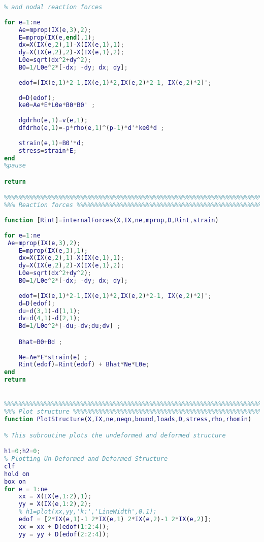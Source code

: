 \begin{lstlisting}[language=Matlab, caption = FE implementation for topology optimization, label=lst:CodeTopo]
% This subroutine recovers the element stress, element strain, 
% and nodal reaction forces
        
for e=1:ne
    Ae=mprop(IX(e,3),2);
    E=mprop(IX(e,end),1);
    dx=X(IX(e,2),1)-X(IX(e,1),1);
    dy=X(IX(e,2),2)-X(IX(e,1),2);
    L0e=sqrt(dx^2+dy^2);
    B0=1/L0e^2*[-dx; -dy; dx; dy];
    
    edof=[IX(e,1)*2-1,IX(e,1)*2,IX(e,2)*2-1, IX(e,2)*2]';
    
    d=D(edof);
    ke0=Ae*E*L0e*B0*B0' ;
    
    dgdrho(e,1)=v(e,1);
    dfdrho(e,1)=-p*rho(e,1)^(p-1)*d'*ke0*d ;
    
    strain(e,1)=B0'*d;
    stress=strain*E;
end
%pause

return

%%%%%%%%%%%%%%%%%%%%%%%%%%%%%%%%%%%%%%%%%%%%%%%%%%%%%%%%%%%%%%%%%%%%%%%%%%%
%%% Reaction forces %%%%%%%%%%%%%%%%%%%%%%%%%%%%%%%%%%%%%%%%%%%%%%%%%%%%%%%                                                        
                                                        
function [Rint]=internalForces(X,IX,ne,mprop,D,Rint,strain)                                                        
                                                        
for e=1:ne
 Ae=mprop(IX(e,3),2);
    E=mprop(IX(e,3),1);
    dx=X(IX(e,2),1)-X(IX(e,1),1);
    dy=X(IX(e,2),2)-X(IX(e,1),2);
    L0e=sqrt(dx^2+dy^2);
    B0=1/L0e^2*[-dx; -dy; dx; dy];
    
    edof=[IX(e,1)*2-1,IX(e,1)*2,IX(e,2)*2-1, IX(e,2)*2]';    
    d=D(edof);
    du=d(3,1)-d(1,1);
    dv=d(4,1)-d(2,1);
    Bd=1/L0e^2*[-du;-dv;du;dv] ;

    Bhat=B0+Bd ;
            
    Ne=Ae*E*strain(e) ;
    Rint(edof)=Rint(edof) + Bhat*Ne*L0e;
end
return


%%%%%%%%%%%%%%%%%%%%%%%%%%%%%%%%%%%%%%%%%%%%%%%%%%%%%%%%%%%%%%%%%%%%%%%%%%%
%%% Plot structure %%%%%%%%%%%%%%%%%%%%%%%%%%%%%%%%%%%%%%%%%%%%%%%%%%%%%%%%
function PlotStructure(X,IX,ne,neqn,bound,loads,D,stress,rho,rhomin)

% This subroutine plots the undeformed and deformed structure

h1=0;h2=0;
% Plotting Un-Deformed and Deformed Structure
clf
hold on
box on
for e = 1:ne
    xx = X(IX(e,1:2),1);
    yy = X(IX(e,1:2),2);
    % h1=plot(xx,yy,'k:','LineWidth',0.1);
    edof = [2*IX(e,1)-1 2*IX(e,1) 2*IX(e,2)-1 2*IX(e,2)];
    xx = xx + D(edof(1:2:4));
    yy = yy + D(edof(2:2:4));
    

\end{lstlisting}
